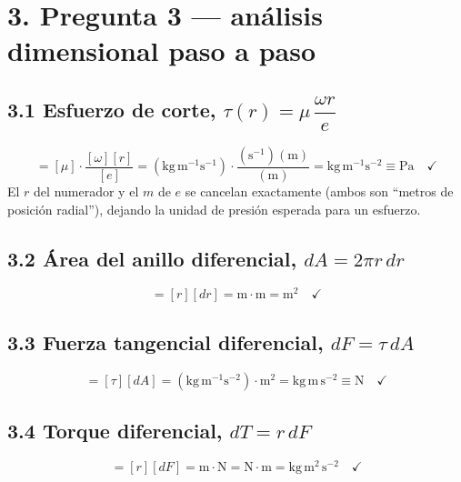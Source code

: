 \documentclass[11pt]{article}
\begin{document}
\section*{3. Pregunta 3 --- an\'alisis dimensional paso a paso}

\subsection*{3.1 Esfuerzo de corte, $\tau(r)=\mu\,\dfrac{\omega r}{e}$}
\begin{equation}
[\tau] = [\mu]\cdot\frac{[\omega][r]}{[e]}
= \left(\text{kg}\,\text{m}^{-1}\text{s}^{-1}\right)\cdot
\frac{\left(\text{s}^{-1}\right)\left(\text{m}\right)}{\left(\text{m}\right)}
= \text{kg}\,\text{m}^{-1}\text{s}^{-2} \equiv \text{Pa}\quad\checkmark
\end{equation}
El $r$ del numerador y el $m$ de $e$ se cancelan exactamente (ambos son ``metros de
posici\'on radial''), dejando la unidad de presi\'on esperada para un esfuerzo.

\subsection*{3.2 \'Area del anillo diferencial, $dA=2\pi r\,dr$}
\begin{equation}
[dA] = [r][dr] = \text{m}\cdot\text{m} = \text{m}^2\quad\checkmark
\end{equation}

\subsection*{3.3 Fuerza tangencial diferencial, $dF=\tau\,dA$}
\begin{equation}
[dF] = [\tau][dA] = \left(\text{kg}\,\text{m}^{-1}\text{s}^{-2}\right)\cdot\text{m}^2
= \text{kg}\,\text{m}\,\text{s}^{-2} \equiv \text{N}\quad\checkmark
\end{equation}

\subsection*{3.4 Torque diferencial, $dT=r\,dF$}
\begin{equation}
[dT] = [r][dF] = \text{m}\cdot\text{N} = \text{N}\cdot\text{m}
= \text{kg}\,\text{m}^2\,\text{s}^{-2}\quad\checkmark
\end{equation}
\end{document}
